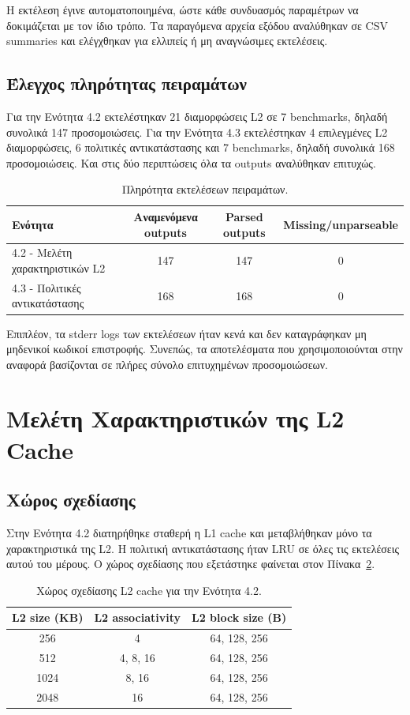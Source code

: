 \documentclass{article}
\begin{document}
Η εκτέλεση έγινε αυτοματοποιημένα, ώστε κάθε συνδυασμός παραμέτρων να δοκιμάζεται με τον ίδιο τρόπο. Τα παραγόμενα αρχεία εξόδου αναλύθηκαν σε CSV summaries και ελέγχθηκαν για ελλιπείς ή μη αναγνώσιμες εκτελέσεις.

\subsection{Έλεγχος πληρότητας πειραμάτων}

Για την Ενότητα 4.2 εκτελέστηκαν 21 διαμορφώσεις L2 σε 7 benchmarks, δηλαδή συνολικά 147 προσομοιώσεις. Για την Ενότητα 4.3 εκτελέστηκαν 4 επιλεγμένες L2 διαμορφώσεις, 6 πολιτικές αντικατάστασης και 7 benchmarks, δηλαδή συνολικά 168 προσομοιώσεις. Και στις δύο περιπτώσεις όλα τα outputs αναλύθηκαν επιτυχώς.

\begin{table}[htbp]
\centering
\caption{Πληρότητα εκτελέσεων πειραμάτων.}
\label{tab:validation}
\begin{tabular}{lccc}
\toprule
\textbf{Ενότητα} & \textbf{Αναμενόμενα outputs} & \textbf{Parsed outputs} & \textbf{Missing/unparseable} \\
\midrule
4.2 - Μελέτη χαρακτηριστικών L2 & 147 & 147 & 0 \\
4.3 - Πολιτικές αντικατάστασης & 168 & 168 & 0 \\
\bottomrule
\end{tabular}
\end{table}

Επιπλέον, τα stderr logs των εκτελέσεων ήταν κενά και δεν καταγράφηκαν μη μηδενικοί κωδικοί επιστροφής. Συνεπώς, τα αποτελέσματα που χρησιμοποιούνται στην αναφορά βασίζονται σε πλήρες σύνολο επιτυχημένων προσομοιώσεων.

\section{Μελέτη Χαρακτηριστικών της L2 Cache}

\subsection{Χώρος σχεδίασης}

Στην Ενότητα 4.2 διατηρήθηκε σταθερή η L1 cache και μεταβλήθηκαν μόνο τα χαρακτηριστικά της L2. Η πολιτική αντικατάστασης ήταν LRU σε όλες τις εκτελέσεις αυτού του μέρους. Ο χώρος σχεδίασης που εξετάστηκε φαίνεται στον Πίνακα~\ref{tab:l2-design-space}.

\begin{table}[htbp]
\centering
\caption{Χώρος σχεδίασης L2 cache για την Ενότητα 4.2.}
\label{tab:l2-design-space}
\begin{tabular}{ccc}
\toprule
\textbf{L2 size (KB)} & \textbf{L2 associativity} & \textbf{L2 block size (B)} \\
\midrule
256 & 4 & 64, 128, 256 \\
512 & 4, 8, 16 & 64, 128, 256 \\
1024 & 8, 16 & 64, 128, 256 \\
2048 & 16 & 64, 128, 256 \\
\bottomrule
\end{tabular}
\end{table}
\end{document}
